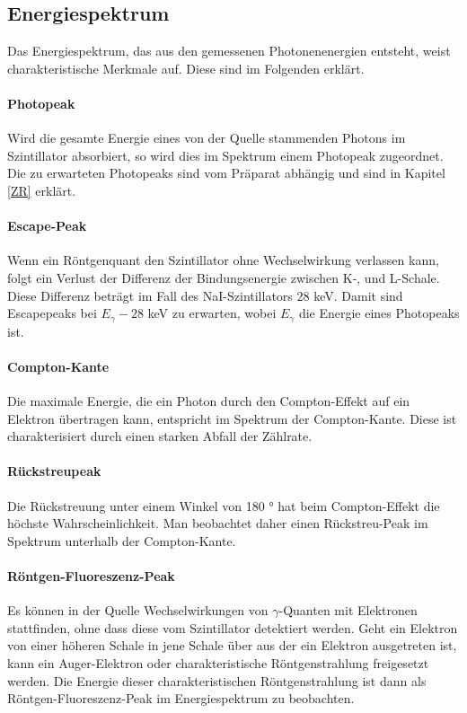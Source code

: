 \documentclass[12pt,listof=totoc]{scrartcl}
\begin{document}
\subsection{Energiespektrum}\label{saskiascoolerabschnitt}

Das Energiespektrum, das aus den gemessenen Photonenenergien entsteht, weist  charakteristische Merkmale auf. Diese sind im Folgenden erklärt. 
 
 
 \paragraph{Photopeak}
 
 Wird die gesamte Energie eines von der Quelle stammenden Photons im Szintillator absorbiert, so wird dies im Spektrum einem Photopeak zugeordnet. Die zu erwarteten Photopeaks sind vom Präparat abhängig und sind in Kapitel \ref{ZR} erklärt.
 \paragraph{Escape-Peak}
 Wenn ein Röntgenquant den Szintillator ohne Wechselwirkung verlassen kann, folgt ein Verlust der Differenz der Bindungsenergie zwischen K-, und L-Schale. Diese Differenz beträgt im Fall des NaI-Szintillators $28$ keV. Damit sind Escapepeaks bei $E_\gamma - 28$ keV zu erwarten, wobei $E_\gamma$ die Energie eines Photopeaks ist.

 \paragraph{Compton-Kante}
 Die maximale Energie, die ein Photon durch den Compton-Effekt auf ein Elektron übertragen kann, entspricht im Spektrum der Compton-Kante. Diese ist charakterisiert durch einen starken Abfall der Zählrate.
 
 \paragraph{Rückstreupeak}
 
 Die Rückstreuung unter einem Winkel von 180 ° hat beim Compton-Effekt die höchste Wahrscheinlichkeit.
 Man beobachtet daher einen Rückstreu-Peak im Spektrum unterhalb der Compton-Kante.

 
 \paragraph{Röntgen-Fluoreszenz-Peak}
Es können in der Quelle Wechselwirkungen von $\gamma$-Quanten mit Elektronen stattfinden, ohne dass diese vom Szintillator detektiert werden. Geht ein Elektron von einer höheren Schale in jene Schale über aus der ein Elektron ausgetreten ist, kann ein Auger-Elektron oder charakteristische Röntgenstrahlung freigesetzt werden. Die Energie dieser charakteristischen Röntgenstrahlung ist dann als Röntgen-Fluoreszenz-Peak im Energiespektrum zu beobachten.
\end{document}
